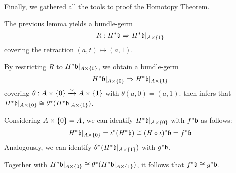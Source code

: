 \begin{myparagraph}
    Finally, we gathered all the tools to proof the Homotopy Theorem.
\end{myparagraph}

\begin{myproof}
    The previous lemma yields a bundle-germ
    \[ \germdef{R}{\ind{H}\bb}{\ind{H}\bb[\cylup{A}]} \]
    covering the retraction $(a, t) \mapsto (a, 1)$.

    By restricting $R$ to $\ind{H}\bb[\cyldown{A}]$, we obtain a bundle-germ
    \[ \germ{\ind{H}\bb[\cyldown{A}]}{\ind{H}\bb[\cylup{A}]} \]
    covering $\theta: A \times{} \{0\} \xrightarrow{\sim} A \times{} \{1\}$ with $\theta(a, 0) = (a, 1)$.
     then infers that
    $\ind{H}\bb[\cyldown{A}] \cong \ind{\theta}(\ind{H}\bb[\cylup{A}])$.
    
    Considering $A \times{} \{0\} = A$,
    we can identify $\ind{H}\bb[\cyldown{A}]$ with $\ind{f}\bb$ as follows:
    \[
        \ind{H}\bb[A \cross \{0\}] =
        \ind{\iota}(\ind{H}\bb) \cong
        \ind{(H \circ \iota)}\bb =
        \ind{f}\bb
    \]
    Analogously, we can identify
    $\ind{\theta}(\ind{H}\bb[\cylup{A}])$ with $\ind{g}\bb$.

    Together with
    $\ind{H}\bb[\cyldown{A}] \cong \ind{\theta}(\ind{H}\bb[\cylup{A}])$,
    it follows that $\ind{f}\bb \cong \ind{g}\bb$.
\end{myproof}